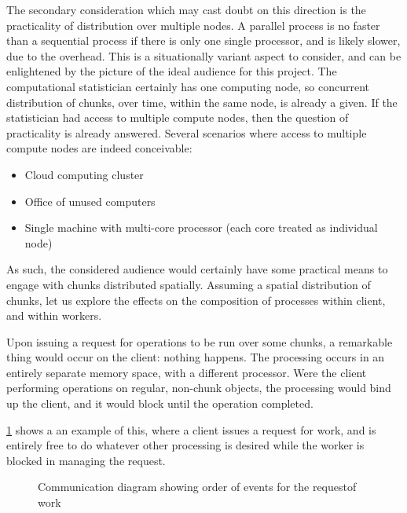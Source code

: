 The secondary consideration which may cast doubt on this direction is
the practicality of distribution over multiple nodes. A parallel process
is no faster than a sequential process if there is only one single
processor, and is likely slower, due to the overhead. This is a
situationally variant aspect to consider, and can be enlightened by the
picture of the ideal audience for this project. The computational
statistician certainly has one computing node, so concurrent
distribution of chunks, over time, within the same node, is already a
given. If the statistician had access to multiple compute nodes, then
the question of practicality is already answered. Several scenarios
where access to multiple compute nodes are indeed conceivable:

\begin{itemize}
  \item
        Cloud computing cluster
  \item
        Office of unused computers
  \item
        Single machine with multi-core processor (each core treated as
        individual node)
\end{itemize}

As such, the considered audience would certainly have some practical
means to engage with chunks distributed spatially. Assuming a spatial
distribution of chunks, let us explore the effects on the composition of
processes within client, and within workers.

Upon issuing a request for operations to be run over some chunks, a
remarkable thing would occur on the client: nothing happens. The
processing occurs in an entirely separate memory space, with a different
processor. Were the client performing operations on regular, non-chunk
objects, the processing would bind up the client, and it would block
until the operation completed.

\cref{fig:work-request} shows a an example of this, where a client issues
a request for work, and is entirely free to do whatever other processing
is desired while the worker is blocked in managing the request.

\begin{figure}
  \centering
  
  \caption{Communication diagram showing order of events for the requestof work}
  \label{fig:work-request}
\end{figure}

